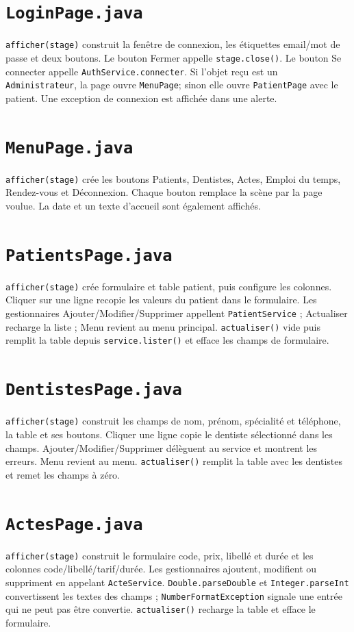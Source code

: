 \documentclass[11pt,a4paper]{report}
\begin{document}
\section{\texttt{LoginPage.java}}
\texttt{afficher(stage)} construit la fenêtre de connexion, les étiquettes email/mot de passe et deux boutons. Le bouton Fermer appelle \texttt{stage.close()}. Le bouton Se connecter appelle \texttt{AuthService.connecter}. Si l'objet reçu est un \texttt{Administrateur}, la page ouvre \texttt{MenuPage}; sinon elle ouvre \texttt{PatientPage} avec le patient. Une exception de connexion est affichée dans une alerte.

\section{\texttt{MenuPage.java}}
\texttt{afficher(stage)} crée les boutons Patients, Dentistes, Actes, Emploi du temps, Rendez-vous et Déconnexion. Chaque bouton remplace la scène par la page voulue. La date et un texte d'accueil sont également affichés.

\section{\texttt{PatientsPage.java}}
\texttt{afficher(stage)} crée formulaire et table patient, puis configure les colonnes. Cliquer sur une ligne recopie les valeurs du patient dans le formulaire. Les gestionnaires Ajouter/Modifier/Supprimer appellent \texttt{PatientService} ; Actualiser recharge la liste ; Menu revient au menu principal.
\texttt{actualiser()} vide puis remplit la table depuis \texttt{service.lister()} et efface les champs de formulaire.

\section{\texttt{DentistesPage.java}}
\texttt{afficher(stage)} construit les champs de nom, prénom, spécialité et téléphone, la table et ses boutons. Cliquer une ligne copie le dentiste sélectionné dans les champs. Ajouter/Modifier/Supprimer délèguent au service et montrent les erreurs. Menu revient au menu.
\texttt{actualiser()} remplit la table avec les dentistes et remet les champs à zéro.

\section{\texttt{ActesPage.java}}
\texttt{afficher(stage)} construit le formulaire code, prix, libellé et durée et les colonnes code/libellé/tarif/durée. Les gestionnaires ajoutent, modifient ou suppriment en appelant \texttt{ActeService}. \texttt{Double.parseDouble} et \texttt{Integer.parseInt} convertissent les textes des champs ; \texttt{NumberFormatException} signale une entrée qui ne peut pas être convertie.
\texttt{actualiser()} recharge la table et efface le formulaire.
\end{document}
